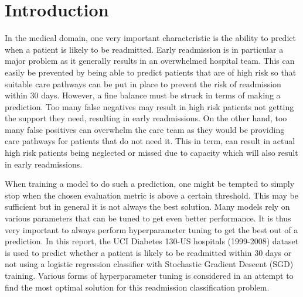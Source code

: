 \section{Introduction}
In the medical domain, one very important characteristic is the ability to predict when a patient is likely to be readmitted. Early readmission is in particular a major problem as it generally 
results in an overwhelmed hospital team. This can easily be prevented by being able to predict patients that are of high risk so that suitable care pathways can be put in place to prevent the 
risk of readmission within 30 days. However, a fine balance must be struck in terms of making a prediction. Too many false negatives may result in high risk patients not getting the support 
they need, resulting in early readmissions. On the other hand, too many false positives can overwhelm the care team as they would be providing care pathways for patients that do not need
it. This in term, can result in actual high risk patients being neglected or missed due to capacity which will also result in early readmissions. 

When training a model to do such a prediction, one might be tempted to simply stop when the chosen evaluation metric is above a certain threshold. This may be 
sufficient but in general it is not always the best solution. Many models rely on various parameters that can be tuned to get even better performance. It is thus
very important to always perform hyperparameter tuning to get the best out of a prediction. In this report, the UCI Diabetes 130-US hospitals (1999-2008) dataset
is used to predict whether a patient is likely to be readmitted within 30 days or not using a logistic regression classifier with Stochastic Gradient Descent (SGD) training.
Various forms of hyperparameter tuning is considered in an attempt to find the most optimal solution for this readmission classification problem.



